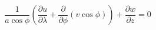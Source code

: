 \begin{equation}
    \frac{1}{a\cos\phi}\left(\frac{\partial u}{\partial\lambda} + \frac{\partial}{\partial\phi}\left(v\cos\phi\right)\right) + \frac{\partial w}{\partial z}=0
\label{EQN:Continuity}
\end{equation}
